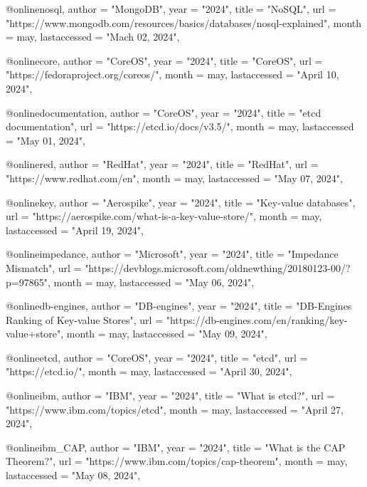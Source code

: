 @online{nosql,
  author =       "MongoDB",
  year =         "2024",
  title =        "NoSQL",
  url =          "https://www.mongodb.com/resources/basics/databases/nosql-explained",
  month =        may,
  lastaccessed = "Mach 02, 2024",
}

@online{core,
  author =       "CoreOS",
  year =         "2024",
  title =        "CoreOS",
  url =          "https://fedoraproject.org/coreos/",
  month =        may,
  lastaccessed = "April 10, 2024",
}

@online{documentation,
  author =       "CoreOS",
  year =         "2024",
  title =        "etcd documentation",
  url =          "https://etcd.io/docs/v3.5/",
  month =        may,
  lastaccessed = "May 01, 2024",
}

@online{red,
  author =       "RedHat",
  year =         "2024",
  title =        "RedHat",
  url =          "https://www.redhat.com/en",
  month =        may,
  lastaccessed = "May 07, 2024",
}

@online{key,
  author =       "Aerospike",
  year =         "2024",
  title =        "Key-value databases",
  url =          "https://aerospike.com/what-is-a-key-value-store/",
  month =        may,
  lastaccessed = "April 19, 2024",
}

@online{impedance,
  author =       "Microsoft",
  year =         "2024",
  title =        "Impedance Mismatch",
  url =          "https://devblogs.microsoft.com/oldnewthing/20180123-00/?p=97865",
  month =        may,
  lastaccessed = "May 06, 2024",
}

@online{db-engines,
  author =       "DB-engines",
  year =         "2024",
  title =        "DB-Engines Ranking of Key-value Stores",
  url =          "https://db-engines.com/en/ranking/key-value+store",
  month =        may,
  lastaccessed = "May 09, 2024",
}

@online{etcd,
  author =       "CoreOS",
  year =         "2024",
  title =        "etcd",
  url =          "https://etcd.io/",
  month =        may,
  lastaccessed = "April 30, 2024",
}

@online{ibm,
  author =       "IBM",
  year =         "2024",
  title =        "What is etcd?",
  url =          "https://www.ibm.com/topics/etcd",
  month =        may,
  lastaccessed = "April 27, 2024",
}

@online{ibm_CAP,
  author =       "IBM",
  year =         "2024",
  title =        "What is the CAP Theorem?",
  url =          "https://www.ibm.com/topics/cap-theorem",
  month =        may,
  lastaccessed = "May 08, 2024",
}

